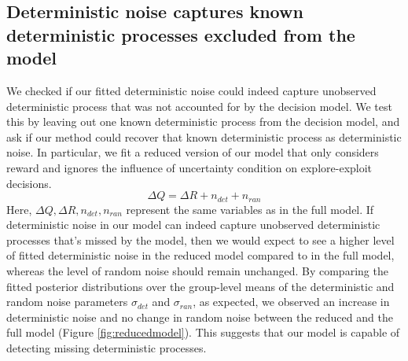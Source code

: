 \documentclass[12pt]{article}
\begin{document}
	\subsection{Deterministic noise captures known deterministic processes excluded from the model}	
	We checked if our fitted deterministic noise could indeed capture unobserved deterministic process that was not accounted for by the decision model. We test this by leaving out one known deterministic process from the decision model, and ask if our method could recover that known deterministic process as deterministic noise. In particular, we fit a reduced version of our model that only considers reward and ignores the influence of uncertainty condition on explore-exploit decisions.  
	$$\Delta Q= \Delta R+n_{det}+n_{ran}$$
	Here, $\Delta Q, \Delta R, n_{det}, n_{ran}$ represent the same variables as in the full model.	If deterministic noise in our model can indeed capture unobserved deterministic processes that's missed by the model, then we would expect to see a higher level of fitted deterministic noise in the reduced model compared to in the full model, whereas the level of random noise should remain unchanged. By comparing the	fitted posterior distributions over the group-level means of the deterministic and random noise parameters $\sigma_{det}$ and $\sigma_{ran}$, as expected, we observed an increase in deterministic noise and no change in random noise between the reduced and the full model (Figure \ref{fig:reducedmodel}). This suggests that our model is capable of detecting missing deterministic processes.
	
\end{document}
